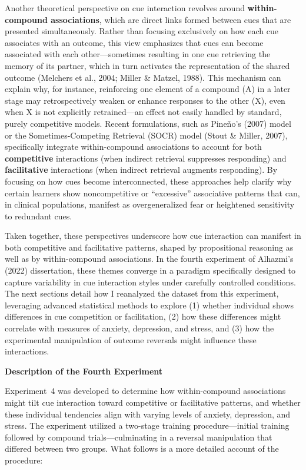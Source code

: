 \documentclass[
  letterpaper,
  DIV=11,
  numbers=noendperiod]{scrartcl}
\begin{document}
Another theoretical perspective on cue interaction revolves around
\textbf{within-compound associations}, which are direct links formed
between cues that are presented simultaneously. Rather than focusing
exclusively on how each cue associates with an outcome, this view
emphasizes that cues can become associated with each other---sometimes
resulting in one cue retrieving the memory of its partner, which in turn
activates the representation of the shared outcome (Melchers et al.,
2004; Miller \& Matzel, 1988). This mechanism can explain why, for
instance, reinforcing one element of a compound (A) in a later stage may
retrospectively weaken or enhance responses to the other (X), even when
X is not explicitly retrained---an effect not easily handled by
standard, purely competitive models. Recent formulations, such as
Pineño's (2007) model or the Sometimes-Competing Retrieval (SOCR) model
(Stout \& Miller, 2007), specifically integrate within-compound
associations to account for both \textbf{competitive} interactions (when
indirect retrieval suppresses responding) and \textbf{facilitative}
interactions (when indirect retrieval augments responding). By focusing
on how cues become interconnected, these approaches help clarify why
certain learners show noncompetitive or ``excessive'' associative
patterns that can, in clinical populations, manifest as overgeneralized
fear or heightened sensitivity to redundant cues.

Taken together, these perspectives underscore how cue interaction can
manifest in both competitive and facilitative patterns, shaped by
propositional reasoning as well as by within-compound associations. In
the fourth experiment of Alhazmi's (2022) dissertation, these themes
converge in a paradigm specifically designed to capture variability in
cue interaction styles under carefully controlled conditions. The next
sections detail how I reanalyzed the dataset from this experiment,
leveraging advanced statistical methods to explore (1) whether
individual shows differences in cue competition or facilitation, (2) how
these differences might correlate with measures of anxiety, depression,
and stress, and (3) how the experimental manipulation of outcome
reversals might influence these interactions.

\textbf{Description of the Fourth Experiment}

Experiment~4 was developed to determine how within-compound associations
might tilt cue interaction toward competitive or facilitative patterns,
and whether these individual tendencies align with varying levels of
anxiety, depression, and stress. The experiment utilized a two-stage
training procedure---initial training followed by compound
trials---culminating in a reversal manipulation that differed between
two groups. What follows is a more detailed account of the procedure:
\end{document}
